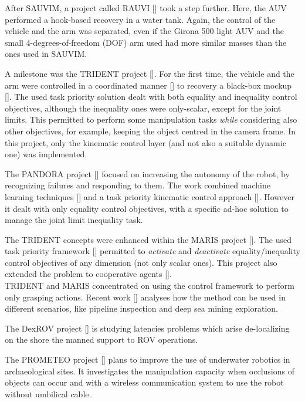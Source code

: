 After SAUVIM, a project called RAUVI [\cite{IntroRauvi}] took a step further. Here, the AUV performed a hook-based recovery in a water tank. Again, the control of the vehicle and the arm was separated, even if the Girona 500 light AUV and the small 4-degrees-of-freedom (DOF) arm used had more similar masses than the ones used in SAUVIM.

A milestone was the TRIDENT project [\cite{IntroTrident1}]. For the first time, the vehicle and the arm were controlled in a coordinated manner [\cite{IntroTrident2}] to recovery a black-box mockup [\cite{IntroTrident4}]. The used task priority solution dealt with both equality and inequality control objectives, although the inequality ones were only-scalar, except for the joint limits. This permitted to perform some manipulation tasks \textit{while} considering also other objectives, for example, keeping the object centred in the camera frame. In this project, only the kinematic control layer (and not also a suitable dynamic one) was implemented.

The PANDORA project [\cite{IntroPandora1}] focused on increasing the autonomy of the robot, by recognizing failures and responding to them. The work combined machine learning techniques [\cite{IntroPandora2}] and a task priority kinematic control approach [\cite{IntroPandora3}]. However it dealt with only equality control objectives, with a specific ad-hoc solution to manage the joint limit inequality task.

The TRIDENT concepts were enhanced within the MARIS project [\cite{IntroMaris0}]. The used task priority framework [\cite{IntroMaris1}] permitted to \textit{activate} and \textit{deactivate} equality/inequality control objectives of any dimension (not only scalar ones). This project also extended the problem to cooperative agents [\cite{IntroMaris2}].\\


TRIDENT and MARIS concentrated on using the control framework to perform only grasping actions. Recent work  [\cite{IntroRecent}] analyses how the method can be used in different scenarios, like pipeline inspection and deep sea mining exploration.

The DexROV project [\cite{IntroDexrov}] is studying latencies problems which arise de-localizing on the shore the manned support to ROV operations.

The PROMETEO project [\cite{IntroPrometeo}] plans to improve the use of underwater robotics in archaeological sites. It investigates the manipulation capacity when occlusions of objects can occur and with a wireless communication system to use the robot without umbilical cable.

